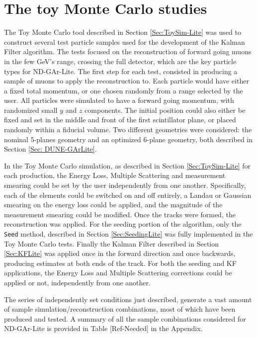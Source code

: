 \section{The toy Monte Carlo studies}
\label{Sec:ToyMCTests-Lite}
The Toy Monte Carlo tool described in Section \ref{Sec:ToySim-Lite} was used to construct several test particle samples used for the development of the Kalman Filter algorithm. The tests focused on the reconstruction of forward going muons in the few GeV's range, crossing the full detector, which are the key particle types for ND-GAr-Lite. The first step for each test, consisted in producing a sample of muons to apply the reconstruction to. Each particle would have either a fixed total momentum, or one chosen randomly from a range selected by the user. All particles were simulated to have a forward going momentum, with randomized small $y$ and $z$ components. The initial position could also either be fixed and set in the middle and front of the first scintillator plane, or placed randomly within a fiducial volume. Two different geometries were considered: the nominal 5-planes geometry and an optimized 6-plane geometry, both described in Section \ref{Sec: DUNE-GArLite}.

In the Toy Monte Carlo simulation, as described in Section \ref{Sec:ToySim-Lite} for each production, the Energy Loss, Multiple Scattering and measurement smearing could be set by the user independently from one another. Specifically, each of the elements could be switched on and off entirely, a Landau or Gaussian smearing on the energy loss could be applied, and the magnitude of the measurement smearing could be modified. Once the tracks were formed, the reconstruction was applied. For the seeding portion of the algorithm, only the \texttt{Seed} method, described in  Section \ref{Sec:SeedingLite} was fully implemented in the Toy Monte Carlo tests. Finally the Kalman Filter described in Section \ref{Sec:KFLite} was applied once in the forward direction and once backwards, producing estimates at both ends of the track. For both the seeding and KF applications, the Energy Loss and Multiple Scattering corrections could be applied or not, independently from one another. 

The series of independently set conditions just described, generate a vast amount of sample simulation/reconstruction combinations, most of which have been produced and tested. A summary of all the sample combinations considered for ND-GAr-Lite is provided in Table [Ref-Needed] in the Appendix. 

